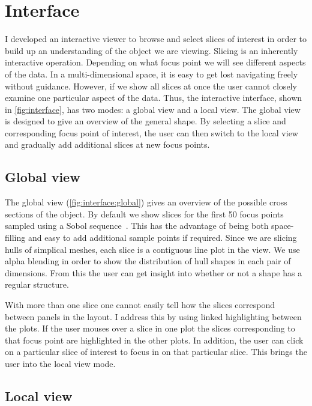 \section{Interface}
\label{sec:interface}

I developed an interactive viewer to browse and select slices of interest in
order to build up an understanding of the object we are viewing. Slicing is an
inherently interactive operation. Depending on what focus point 
we will see different aspects of the data. In a multi-dimensional
space, it is easy to get lost navigating freely without guidance.
However, if we show all slices at once the user cannot closely examine one
particular aspect of the data.  Thus, the interactive interface, shown in
\autoref{fig:interface}, has two modes: a global view and a local view. The
global view is designed to give an overview of the general shape.  By selecting 
a slice and corresponding focus point of interest, the user can then
switch to the local view and gradually add additional slices at new focus
points.

\subsection{Global view}

The global view (\autoref{fig:interface:global}) gives an overview of the
possible cross sections of the object. By default we show slices for the first
50 focus points sampled using a Sobol sequence~\cite{Sobol:1967}. This has the
advantage of being both space-filling and easy to add additional sample points
if required. Since we are slicing hulls of simplical meshes, each slice is a contiguous
line plot in the view. We use alpha blending in order to show the distribution
of hull shapes in each pair of dimensions. 
From this the user can get insight into whether or not a shape has a regular 
structure.

With more than one slice one cannot easily tell how the slices correspond 
between panels in the layout. I address this by using linked highlighting
between the plots. If the user mouses over a slice in one plot the slices
corresponding to that focus point are highlighted in the other plots. In 
addition, the user can click on a particular slice of interest to focus in 
on that particular slice. This brings the user into the local view mode.

\subsection{Local view}

